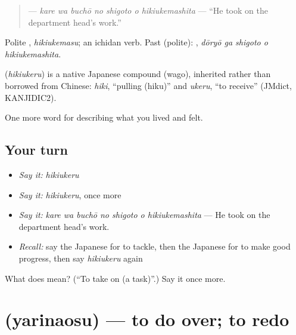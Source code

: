 \begin{quote}
\textbf{   } — \emph{kare wa buchō no shigoto o hikiukemashita} — \textquotedblleft{}He took on the department head's work.\textquotedblright{}
\end{quote}

Polite \textbf{}, \emph{hikiukemasu}; an ichidan verb. Past (polite): \textbf{  }, \emph{dōryō ga shigoto o hikiukemashita}.

\begin{cousinweb}
\textbf{} (\emph{hikiukeru}) is a native Japanese compound (wago), inherited rather than borrowed from Chinese: \emph{hiki}, \textquotedblleft{}pulling (hiku)\textquotedblright{} and \emph{ukeru}, \textquotedblleft{}to receive\textquotedblright{} (JMdict, KANJIDIC2).
\end{cousinweb}

\begin{grammarlens}[title={What you've built}]
One more word for describing what you lived and felt.
\end{grammarlens}

\subsection*{Your turn}
\begin{itemize}
\raggedright
  \item \emph{Say it:} \emph{hikiukeru}
  \item \emph{Say it:} \emph{hikiukeru}, once more
  \item \emph{Say it:} \emph{kare wa buchō no shigoto o hikiukemashita} — He took on the department head's work.
  \item \emph{Recall:} say the Japanese for to tackle, then the Japanese for to make good progress, then say \emph{hikiukeru} again
\end{itemize}

\begin{tcolorbox}[breakable,colback=teal!4,colframe=teal!35!black,title={Before you move on}]
What does  mean? (\textquotedblleft{}To take on (a task)\textquotedblright{}.) Say it once more.
\end{tcolorbox}
\section[\texorpdfstring{\ja{やりなおす} (yarinaosu)}{やりなおす (yarinaosu)}]{ (yarinaosu) — to do over; to redo}

